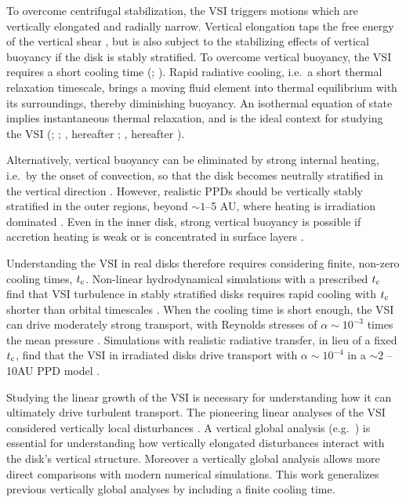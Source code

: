 \documentclass[iop, numberedappendix]{emulateapj}
\begin{document}
To overcome centrifugal stabilization, the VSI triggers motions which are vertically elongated 
and radially narrow.  %
Vertical elongation taps the free energy of the vertical shear \citep{umurhan13}, but is also subject to 
the stabilizing effects of vertical buoyancy if the disk is stably
stratified. To overcome vertical buoyancy, the VSI requires a short cooling time
(; ). Rapid radiative 
cooling, i.e.\ a short thermal relaxation timescale, brings a
moving fluid element into thermal equilibrium with 
its surroundings, thereby diminishing buoyancy. %
An isothermal equation of state implies instantaneous thermal relaxation, and is the ideal context for studying the VSI
(\citealp{urpin03}; ; \citealp{mcnally14}, hereafter ; \citealp{barker15},
hereafter ).    

Alternatively, vertical buoyancy can be eliminated by strong internal
heating, i.e.\ by the onset of convection, so that the disk becomes 
neutrally stratified in the vertical direction
. However, realistic PPDs should be vertically
stably stratified in the outer regions, beyond $\sim 1$--5 AU, where
heating is  irradiation dominated \citep{bitsch15}.  Even in the inner
disk, strong vertical buoyancy is possible if accretion heating is
weak or is concentrated in surface layers \citep{gammie96,lesniak11}.  

Understanding the VSI in real disks therefore requires
considering finite, non-zero cooling times, $t_{\rm c}$. Non-linear
hydrodynamical simulations with a prescribed  $t_{\rm c}$ find that VSI
turbulence in stably stratified disks requires rapid cooling  
with $t_{\rm c}$ shorter than orbital timescales
 . When the cooling time is short enough, 
 the VSI can drive moderately strong transport, with Reynolds
stresses of $\alpha \sim 10^{-3}$ times the mean pressure . Simulations
with realistic radiative transfer, in lieu of a fixed $t_{\rm
  c}$, find that the VSI in irradiated disks drive transport with
$\alpha \sim 10^{-4}$  in a  $\sim 2$ -- 10AU PPD model \citep{stoll14}.  

Studying the linear growth of the VSI is necessary for 
understanding how it can ultimately drive turbulent transport.
The pioneering linear analyses of the VSI considered vertically 
local disturbances \citep{urpin98,urpin03}.  A vertical global analysis 
(e.g.\ ) 
is essential for understanding how vertically elongated disturbances 
interact with the disk's vertical structure.  Moreover a vertically global analysis
allows more direct comparisons with modern numerical simulations.  This work 
generalizes previous vertically global analyses by including a finite cooling time.
\end{document}
